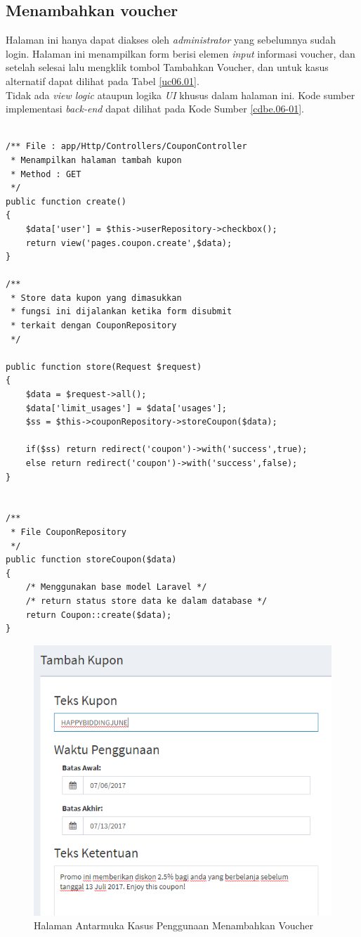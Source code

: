 \subsection{Menambahkan voucher}
Halaman ini hanya dapat diakses oleh \textit{administrator} yang sebelumnya sudah login. Halaman ini menampilkan form berisi elemen \textit{input} informasi voucher, dan setelah selesai lalu mengklik tombol Tambahkan Voucher, dan untuk kasus alternatif dapat dilihat pada Tabel \ref{uc06.01}.\\
\indent Tidak ada \textit{view logic} ataupun logika \textit{UI} khusus dalam halaman ini. Kode sumber implementasi \textit{back-end} dapat dilihat pada Kode Sumber \ref{cdbe.06-01}.

\begin{lstlisting}[label=cdbe.06-01,style=php,caption=Kode Sumber Antarmuka Registrasi]

/** File : app/Http/Controllers/CouponController
 * Menampilkan halaman tambah kupon
 * Method : GET
 */
public function create()
{
    $data['user'] = $this->userRepository->checkbox();
    return view('pages.coupon.create',$data);
}

/**
 * Store data kupon yang dimasukkan
 * fungsi ini dijalankan ketika form disubmit
 * terkait dengan CouponRepository
 */

public function store(Request $request)
{
    $data = $request->all();
    $data['limit_usages'] = $data['usages'];
    $ss = $this->couponRepository->storeCoupon($data);

    if($ss) return redirect('coupon')->with('success',true);
    else return redirect('coupon')->with('success',false);
}


/**
 * File CouponRepository
 */
public function storeCoupon($data)
{
	/* Menggunakan base model Laravel */
	/* return status store data ke dalam database */
    return Coupon::create($data);
}  
\end{lstlisting}
	  
      \begin{figure}[H]
        \centering
        \includegraphics[width=\textwidth]{images/bab4/ui/06-01.png}
        \caption{Halaman Antarmuka Kasus Penggunaan Menambahkan Voucher}
        \label{ui.01-01}
      \end{figure}
      
